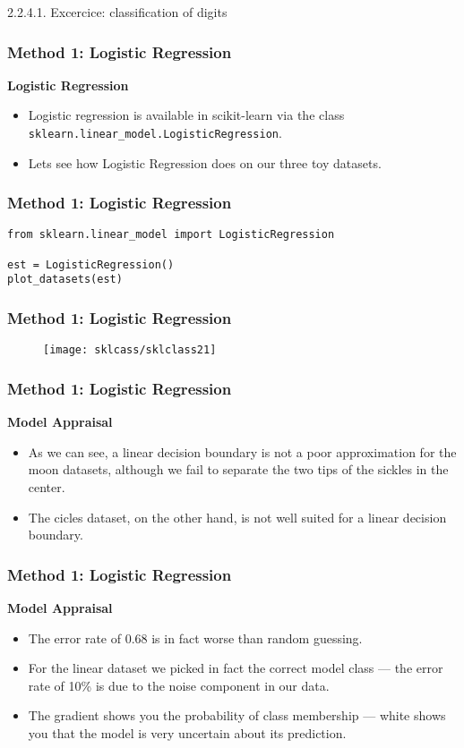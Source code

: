 2.2.4.1. Excercice: classification of digits\documentclass[MASTER.tex]{subfiles}
\begin{document}

		\frametitle{Method 1: Logistic Regression}
	\Large
	\textbf{Logistic Regression}
\begin{itemize}
\item Logistic regression is available in scikit-learn via the class \texttt{sklearn.linear\_model.LogisticRegression}. 
\item Lets see how Logistic Regression does on our three toy datasets.
\end{itemize}





		\frametitle{Method 1: Logistic Regression}
	\begin{framed}
		\begin{verbatim}
from sklearn.linear_model import LogisticRegression

est = LogisticRegression()
plot_datasets(est)
	\end{verbatim}
\end{framed}



		\frametitle{Method 1: Logistic Regression}
	\begin{figure}
		\centering
		\texttt{[image: sklcass/sklclass21]}
		
	\end{figure}


	\frametitle{Method 1: Logistic Regression}
	\Large
	\textbf{Model Appraisal}
\begin{itemize}
\item	As we can see, a linear decision boundary is not a poor approximation for the moon datasets, although we fail to separate the two tips of the sickles in the center. 
\item The cicles dataset, on the other hand, is not well suited for a linear decision boundary. 
\end{itemize}


	\frametitle{Method 1: Logistic Regression}
		\Large
		\textbf{Model Appraisal}
	\begin{itemize}
		
		\item The error rate of 0.68 is in fact worse than random guessing. \item For the linear dataset we picked in fact the correct model class — the error rate of 10\% is due to the noise component in our data. 
\item The gradient shows you the probability of class membership — white shows you that the model is very uncertain about its prediction.
\end{itemize}
\end{document}
